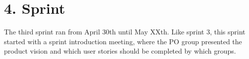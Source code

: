 \chapter{4. Sprint}
The third sprint ran from April 30th until May XXth. Like sprint 3, this sprint started with a sprint introduction meeting, where the PO group presented the product vision and which user stories should be completed by which groups. 

